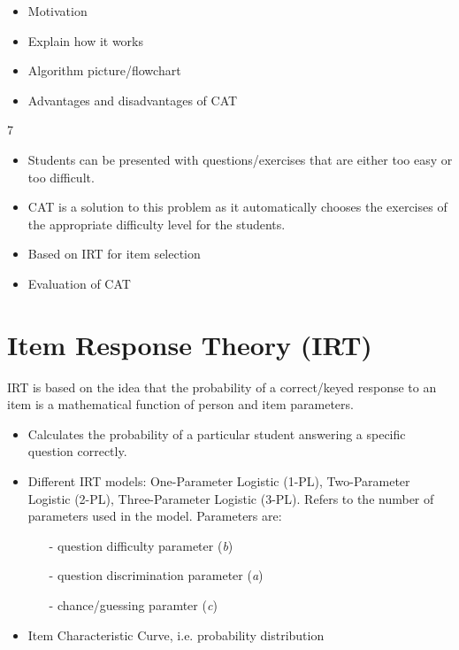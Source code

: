 \documentclass[11pt,a4paper]{report}
\begin{document}
\begin{itemize}
\item Motivation
\item Explain how it works
\item Algorithm picture/flowchart
\item Advantages and disadvantages of CAT
\end{itemize}

7%
\begin{itemize}
\item Students can be presented with questions/exercises that are either too easy or too difficult.
\item CAT is a solution to this problem as it automatically chooses the exercises of the appropriate difficulty level for the students.
\item Based on IRT for item selection
\item Evaluation of CAT
\end{itemize}

\section{Item Response Theory (IRT)}

IRT is based on the idea that the probability of a correct/keyed response to an item is a mathematical function of person and item parameters. 

\begin{itemize}
\item Calculates the probability of a particular student answering a specific question correctly.
\item Different IRT models: One-Parameter Logistic (1-PL), Two-Parameter Logistic (2-PL), Three-Parameter Logistic (3-PL). Refers to the number of parameters used in the model. Parameters are: 

\begin{itemize}
\item[-] question difficulty parameter (\textit{b})
\item[-] question discrimination parameter (\textit{a})
\item[-] chance/guessing paramter (\textit{c})
\end{itemize}

\item Item Characteristic Curve, i.e. probability distribution

\end{itemize}
\end{document}
